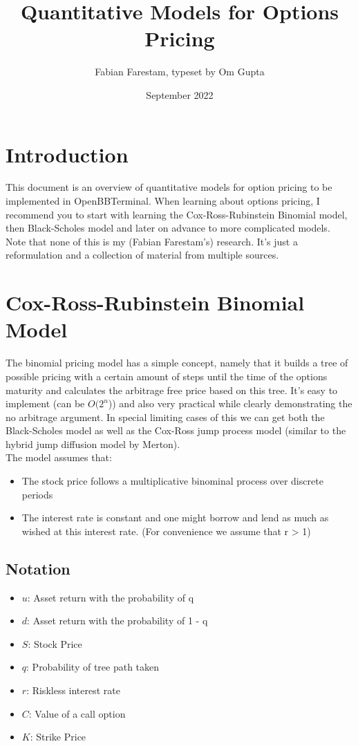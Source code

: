 \documentclass{article}
\title{Quantitative Models for Options Pricing}
\author{Fabian Farestam, typeset by Om Gupta}
\date{September 2022}
\begin{document}
\maketitle

\section{Introduction}

This document is an overview of quantitative models for option pricing to be implemented in OpenBBTerminal. When learning about options pricing, I recommend you to start with learning the Cox-Ross-Rubinstein Binomial model, then Black-Scholes model and later on advance to more complicated models. \\
Note that none of this is my (Fabian Farestam’s) research. It’s just a reformulation and a collection of material from multiple sources.

\section{Cox-Ross-Rubinstein Binomial Model}

The binomial pricing model has a simple concept, namely that it builds a tree of possible pricing with a certain amount of steps until the time of the options maturity and calculates the arbitrage free price based on this tree. It’s easy to implement (can be $O(2^{n}$)) and also very practical while clearly demonstrating the no arbitrage argument. In special limiting cases of this we can get both the Black-Scholes model as well as the Cox-Ross jump process model (similar to the hybrid jump diffusion model by Merton). \\
The model assumes that:

\begin{itemize}
    \item The stock price follows a multiplicative binominal process over discrete periods
    \item The interest rate is constant and one might borrow and lend as much as wished at this interest rate. (For convenience we assume that r > 1)
\end{itemize}

\subsection{Notation}
\begin{itemize}
    \item $u$: Asset return with the probability of q 
    \item $d$: Asset return with the probability of 1 - q
    \item $S$: Stock Price
    \item $q$: Probability of tree path taken
    \item $r$: Riskless interest rate
    \item $C$: Value of a call option
    \item $K$: Strike Price
\end{itemize}
\end{document}
